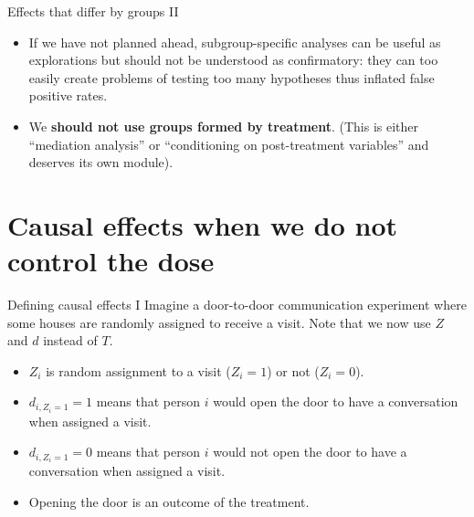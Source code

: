 \documentclass[
  ignorenonframetext,
]{beamer}
\providecommand{\tightlist}{%
  \setlength{\itemsep}{0pt}\setlength{\parskip}{0pt}}
\begin{document}
\begin{frame}{Effects that differ by groups II}
\protect\hypertarget{effects-that-differ-by-groups-ii}{}
\begin{itemize}
\item
  If we have not planned ahead, subgroup-specific analyses can be useful
  as explorations but should not be understood as confirmatory: they can
  too easily create problems of testing too many hypotheses thus
  inflated false positive rates.
\item
  We \textbf{should not use groups formed by treatment}. (This is either
  ``mediation analysis'' or ``conditioning on post-treatment variables''
  and deserves its own module).
\end{itemize}
\end{frame}

\hypertarget{causal-effects-when-we-do-not-control-the-dose}{%
\section{Causal effects when we do not control the
dose}\label{causal-effects-when-we-do-not-control-the-dose}}

\begin{frame}{Defining causal effects I}
\protect\hypertarget{defining-causal-effects-i}{}
Imagine a door-to-door communication experiment where some houses are
randomly assigned to receive a visit. Note that we now use \(Z\) and
\(d\) instead of \(T\).

\begin{itemize}
\tightlist
\item
  \(Z_i\) is random assignment to a visit (\(Z_i=1\)) or not
  (\(Z_i=0\)).
\item
  \(d_{i,Z_i=1}=1\) means that person \(i\) would open the door to have
  a conversation when assigned a visit.
\item
  \(d_{i,Z_i=1}=0\) means that person \(i\) would not open the door to
  have a conversation when assigned a visit.
\item
  Opening the door is an outcome of the treatment.
\end{itemize}

\begin{center}
\end{center}
\end{frame}
\end{document}
